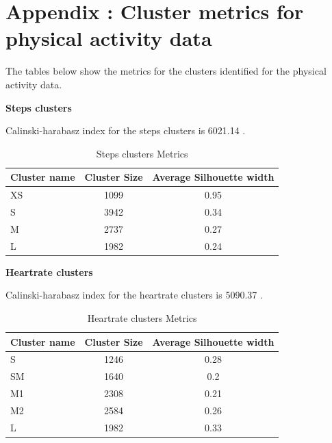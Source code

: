 \documentclass{article}
\begin{document}
\section{Appendix : Cluster metrics for physical activity data}

The tables below show the metrics for the clusters identified for the physical activity data. 

\textbf{Steps clusters}

Calinski-harabasz index for the steps clusters is 6021.14 .

\begin{table}[h]
  \caption{Steps clusters Metrics}
  \label{steps_metrics}
  \centering
  \begin{tabular}{ |l|c|c|}
    \toprule
    \cmidrule(r){1-2}
    Cluster name & Cluster Size & Average Silhouette width \\
    \midrule
    XS & 1099 & 0.95 \\
    S & 3942 & 0.34 \\
    M & 2737 & 0.27 \\
    L & 1982 & 0.24 \\
    \bottomrule
    \end{tabular}
\end{table}

\textbf{Heartrate clusters}

Calinski-harabasz index for the heartrate clusters is 5090.37 .

\begin{table}[h]
  \caption{Heartrate clusters Metrics}
  \label{hr_metrics}
  \centering
  \begin{tabular}{ |l|c|c|}
    \toprule
    \cmidrule(r){1-2}
    Cluster name & Cluster Size & Average Silhouette width \\
    \midrule
    S & 1246 & 0.28 \\
    SM & 1640 & 0.2 \\
    M1 & 2308 & 0.21 \\
    M2 & 2584 & 0.26 \\
    L & 1982 & 0.33 \\
    \bottomrule
    \end{tabular}
\end{table}
\end{document}
